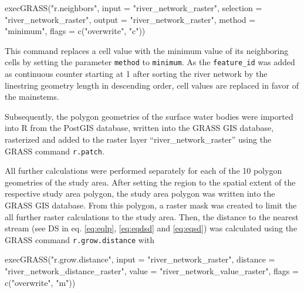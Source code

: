 \documentclass[fleqn,10pt]{wlscirep}
\newenvironment{Shaded}{\begin{snugshade}}{\end{snugshade}}
\newcommand{\AttributeTok}[1]{\textcolor[rgb]{0.77,0.63,0.00}{#1}}
\newcommand{\FunctionTok}[1]{\textcolor[rgb]{0.00,0.00,0.00}{#1}}
\newcommand{\NormalTok}[1]{#1}
\newcommand{\StringTok}[1]{\textcolor[rgb]{0.31,0.60,0.02}{#1}}
\begin{document}
\footnotesize

\begin{Shaded}
\begin{Highlighting}[]
\FunctionTok{execGRASS}\NormalTok{(}\StringTok{"r.neighbors"}\NormalTok{,}
          \AttributeTok{input =} \StringTok{"river\_network\_raster"}\NormalTok{,}
          \AttributeTok{selection =} \StringTok{"river\_network\_raster"}\NormalTok{,}
          \AttributeTok{output =} \StringTok{"river\_network\_raster"}\NormalTok{,}
          \AttributeTok{method =} \StringTok{"minimum"}\NormalTok{,}
          \AttributeTok{flags =} \FunctionTok{c}\NormalTok{(}\StringTok{"overwrite"}\NormalTok{, }\StringTok{"c"}\NormalTok{))}
\end{Highlighting}
\end{Shaded}

\normalsize

This command replaces a cell value with the minimum value of its neighboring cells by setting the parameter \texttt{method} to \texttt{minimum}. As the \texttt{feature\_id} was added as continuous counter starting at 1 after sorting the river network by the linestring geometry length in descending order, cell values are replaced in favor of the mainstems.

Subsequently, the polygon geometries of the surface water bodies were imported into R from the PostGIS database, written into the GRASS GIS database, rasterized and added to the raster layer ``river\_network\_raster'' using the GRASS command \texttt{r.patch}.

All further calculations were performed separately for each of the 10 polygon geometries of the study area. After setting the region to the spatial extent of the respective study area polygon, the study area polygon was written into the GRASS GIS database. From this polygon, a raster mask was created to limit the all further raster calculations to the study area.
Then, the distance to the nearest stream (see DS in eq. \eqref{eq:eqlp}, \eqref{eq:eqdsd} and \eqref{eq:eqsd}) was calculated using the GRASS command \texttt{r.grow.distance} with

\footnotesize

\begin{Shaded}
\begin{Highlighting}[]
\FunctionTok{execGRASS}\NormalTok{(}\StringTok{"r.grow.distance"}\NormalTok{,}
          \AttributeTok{input =} \StringTok{"river\_network\_raster"}\NormalTok{,}
          \AttributeTok{distance =} \StringTok{"river\_network\_distance\_raster"}\NormalTok{, }
          \AttributeTok{value =} \StringTok{"river\_network\_value\_raster"}\NormalTok{, }
          \AttributeTok{flags =} \FunctionTok{c}\NormalTok{(}\StringTok{"overwrite"}\NormalTok{, }\StringTok{"m"}\NormalTok{))}
\end{Highlighting}
\end{Shaded}
\end{document}
